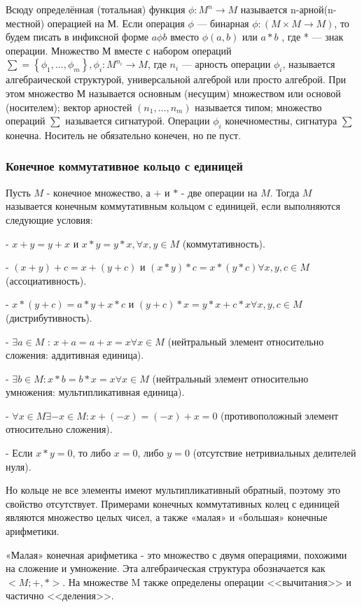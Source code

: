 \documentclass[10pt,a4paper,final]{article} %
\begin{document}
	Всюду определённая (тотальная) функция $\phi: M^n \rightarrow M$ называется n-арной(n-местной) операцией на М. Если операция $\phi$ — бинарная $\phi: (M \times M \rightarrow M)$, то будем писать в инфиксной форме $a \phi b$ вместо $\phi(a, b)$ или $ a * b$ , где * — знак операции. Множество М вместе с набором операций $\sum = \left\{\phi_1, \dots, \phi_m\right\}, \phi_i: M^{n_i} \rightarrow M$, где $n_i$ — арность операции $\phi_i$, называется алгебраической структурой, универсальной алгеброй или просто алгеброй. При этом множество М называется основным (несущим) множеством или основой (носителем); вектор арностей $(n_1, \dots ,n_m)$ называется типом; множество операций $\sum$ называется сигнатурой. Операции $\phi_i$ конечноместны, сигнатура $\sum $ конечна. Носитель не обязательно конечен, но пе пуст.
	
	\subsubsection{Конечное коммутативное кольцо с единицей}
	
	Пусть $M$ - конечное множество, а $+$ и $*$ - две операции на $M$. Тогда $M$ называется конечным коммутативным кольцом с единицей, если выполняются следующие условия:
	
	- $x+y=y+x$ и $x * y=y * x, \forall x, y \in M$ (коммутативность).
	
	- $(x+y)+c=x+(y+c)$ и $(x * y) * c=x * (y * c) \forall x, y, c \in M$ (ассоциативность).
	
	- $x * (y+c)=a * y+x * c$ и $(y+c) * x=y * x+c * x \forall x, y, c \in M$ (дистрибутивность).
	
	- $\exists a \in M$ : $x+a=a+x=x \forall x \in M$ (нейтральный элемент относительно сложения: аддитивная единица).
	
	- $\exists b \in M : x * b=b * x=x \forall x \in M$ (нейтральный элемент относительно умножения: мультипликативная единица).
	
	- $\forall x \in M \exists -x \in M : x+(-x)=(-x)+x=0$ (противоположный элемент относительно сложения).
	
	- Если $x * y=0$, то либо $x=0$, либо $y=0$  (отсутствие нетривиальных делителей нуля).
	
	Но кольце не все элементы имеют мультипликативный обратный, поэтому это свойство отсутствует. Примерами конечных коммутативных колец с единицей являются множество целых чисел, а также «малая» и «большая» конечные арифметики.
	
	«Малая» конечная арифметика - это множество с двумя операциями, похожими на сложение и умножение. Эта алгебраическая структура обозначается как $<M ;+, *>$. На множестве M также определены операции <<вычитания>> и частично <<деления>>.
	
\end{document}
